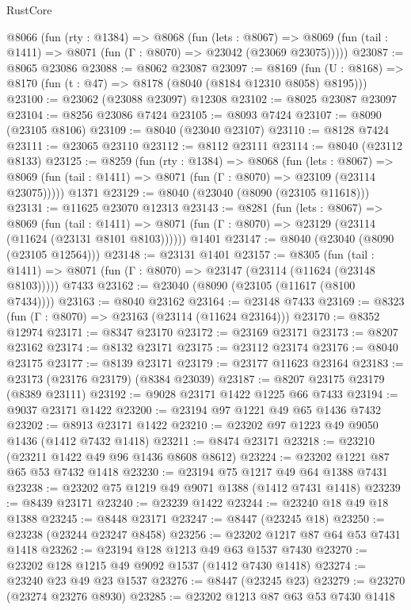 \begin{lexlean}{RustCore}
\begin{coremodule}
  @8066
    (fun (rty : @1384) =>
    @8068
      (fun (lets : @8067) =>
      @8069 (fun (tail : @1411) => @8071 (fun (Γ : @8070) => @23042 (@23069 @23075)))))
@23087 := @8065 @23086
@23088 := @8062 @23087
@23097 := @8169
    (fun (U : @8168) => @8170 (fun (t : @47) => @8178 (@8040 (@8184 @12310 @8058) @8195)))
@23100 := @23062 (@23088 @23097) @12308
@23102 := @8025 @23087 @23097
@23104 := @8256 @23086 @7424
@23105 := @8093 @7424
@23107 := @8090 (@23105 @8106)
@23109 := @8040 (@23040 @23107)
@23110 := @8128 @7424
@23111 := @23065 @23110
@23112 := @8112 @23111
@23114 := @8040 (@23112 @8133)
@23125 := @8259
    (fun (rty : @1384) =>
    @8068
      (fun (lets : @8067) =>
      @8069 (fun (tail : @1411) => @8071 (fun (Γ : @8070) => @23109 (@23114 @23075)))))
    @1371
@23129 := @8040 (@23040 (@8090 (@23105 @11618)))
@23131 := @11625 @23070 @12313
@23143 := @8281
    (fun (lets : @8067) =>
    @8069
      (fun (tail : @1411) =>
      @8071 (fun (Γ : @8070) => @23129 (@23114 (@11624 (@23131 @8101 @8103))))))
    @1401
@23147 := @8040 (@23040 (@8090 (@23105 @12564)))
@23148 := @23131 @1401
@23157 := @8305
    (fun (tail : @1411) => @8071 (fun (Γ : @8070) => @23147 (@23114 (@11624 (@23148 @8103)))))
    @7433
@23162 := @23040 (@8090 (@23105 (@11617 (@8100 @7434))))
@23163 := @8040 @23162
@23164 := @23148 @7433
@23169 := @8323 (fun (Γ : @8070) => @23163 (@23114 (@11624 @23164)))
@23170 := @8352 @12974
@23171 := @8347 @23170
@23172 := @23169 @23171
@23173 := @8207 @23162
@23174 := @8132 @23171
@23175 := @23112 @23174
@23176 := @8040 @23175
@23177 := @8139 @23171
@23179 := @23177 @11623 @23164
@23183 := @23173 (@23176 @23179) (@8384 @23039)
@23187 := @8207 @23175 @23179 (@8389 @23111)
@23192 := @9028 @23171 @1422 @1225 @66 @7433
@23194 := @9037 @23171 @1422
@23200 := @23194 @97 @1221 @49 @65 @1436 @7432
@23202 := @8913 @23171 @1422
@23210 := @23202 @97 @1223 @49 @9050 @1436 (@1412 @7432 @1418)
@23211 := @8474 @23171
@23218 := @23210 (@23211 @1422 @49 @96 @1436 @8608 @8612)
@23224 := @23202 @1221 @87 @65 @53 @7432 @1418
@23230 := @23194 @75 @1217 @49 @64 @1388 @7431
@23238 := @23202 @75 @1219 @49 @9071 @1388 (@1412 @7431 @1418)
@23239 := @8439 @23171
@23240 := @23239 @1422
@23244 := @23240 @18 @49 @18 @1388
@23245 := @8448 @23171
@23247 := @8447 (@23245 @18)
@23250 := @23238 (@23244 @23247 @8458)
@23256 := @23202 @1217 @87 @64 @53 @7431 @1418
@23262 := @23194 @128 @1213 @49 @63 @1537 @7430
@23270 := @23202 @128 @1215 @49 @9092 @1537 (@1412 @7430 @1418)
@23274 := @23240 @23 @49 @23 @1537
@23276 := @8447 (@23245 @23)
@23279 := @23270 (@23274 @23276 @8930)
@23285 := @23202 @1213 @87 @63 @53 @7430 @1418

\end{coremodule}
\end{lexlean}
